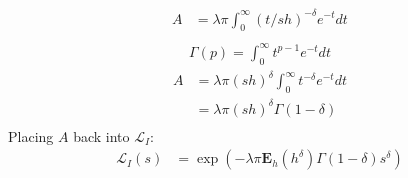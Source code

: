 %
\begin{equation}
  \begin{split}
A& = \lambda \pi \int_0^\infty (t/sh)^{-\delta} e^{-t} dt\\
  \end{split}
\end{equation}
%
\begin{equation}
  \begin{split}
  \Gamma(p) = \int_{0}^{\infty} t^{p-1} e^{-t} dt
  \end{split}
\end{equation}
%
\begin{equation}
  \begin{split}
A& = \lambda \pi (sh)^{\delta} \int_0^\infty t^{-\delta} e^{-t} dt\\
&= \lambda \pi (sh)^{\delta} \Gamma(1-\delta)\\
  \end{split}
\end{equation}
%
Placing $A$ back into $\mathcal{L}_I$:
%
\begin{equation}
  \begin{split}
    \mathcal{L}_I (s) &= \exp(-\lambda \pi \textbf{E}_h(h^\delta)\Gamma(1-\delta)s^\delta) \\
  \end{split}
\end{equation}
%
